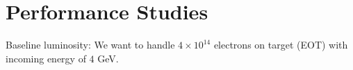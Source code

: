 
\section{Performance Studies}

Baseline luminosity:  We want to handle $4\times 10^{14}$ electrons on target 
(EOT) with incoming energy of $4$ GeV. 











